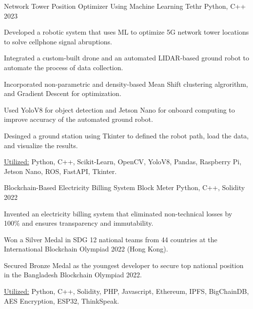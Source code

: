 

\begin{cventries}

  \cventryprojects
    {Network Tower Position Optimizer Using Machine Learning} %
    {Tethr} %
    {Python, C++} %
    {2023} %
    {
      \begin{cvitems} %
        \item {Developed a robotic system that uses ML to optimize 5G network tower locations 
        to solve cellphone signal abruptions.}
        \item {Integrated a custom-built drone and an automated LIDAR-based ground robot to automate the process of 
        data collection.}
        \item {Incorporated non-parametric and density-based Mean Shift clustering algrorithm, and Gradient Descent 
        for optimization.}
        \item {Used YoloV8 for object detection and Jetson Nano for onboard computing to improve accuracy of the automated 
        ground robot.}
        \item {Desinged a ground station using Tkinter to defined the robot path, load the data, and visualize the results.}
        \item {\underline{Utilized:} Python, C++, Scikit-Learn, OpenCV, YoloV8, Pandas, Raspberry Pi, Jetson Nano, ROS, FastAPI, Tkinter.}
      \end{cvitems}
      }
      
      \cventryprojects
      {Blockchain-Based Electricity Billing System } %
      {Block Meter} %
      {Python, C++, Solidity} %
      {2022} %
      {
        \begin{cvitems} %
          \item {Invented an electricity billing system that eliminated non-technical losses by 100\% and ensures transparency and immutability.}
          \item {Won a Silver Medal in SDG 12 national teams from 44 countries at the International Blockchain Olympiad 2022 (Hong Kong).}
          \item {Secured Bronze Medal as the youngest developer to secure top national position in the Bangladesh Blockchain Olympiad 2022.}
          \item {\underline{Utilized:} Python, C++, Solidity, PHP, Javascript, Ethereum, IPFS, BigChainDB, AES Encryption, ESP32, ThinkSpeak.}
        \end{cvitems}
        }
          

\end{cventries}
